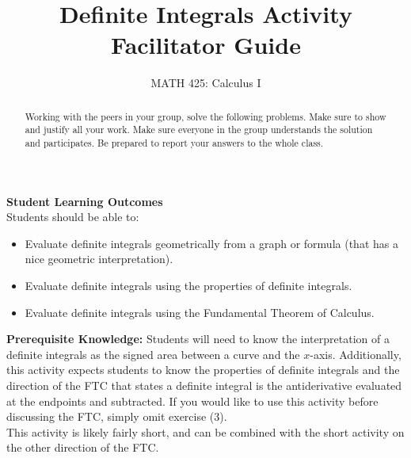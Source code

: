 \documentclass{ximera}
\title{Definite Integrals Activity Facilitator Guide}
\author{MATH 425: Calculus I}
\begin{document}
\begin{abstract}
   Working with the peers in your group, solve the following problems. Make sure to show and justify all your work. Make sure everyone in the group understands the solution and participates. Be prepared to report your answers to the whole class. 
\end{abstract}
\maketitle

\textbf{Student Learning Outcomes}\\
Students should be able to:
    \begin{itemize}
        \item Evaluate definite integrals geometrically from a graph or formula (that has a nice geometric interpretation).
        \item Evaluate definite integrals using the properties of definite integrals.
        \item Evaluate definite integrals using the Fundamental Theorem of Calculus.
    \end{itemize}

\textbf{Prerequisite Knowledge:} Students will need to know the interpretation of a definite integrals as the signed area between a curve and the $x$-axis.  Additionally, this activity expects students to know the properties of definite integrals and the direction of the FTC that states a definite integral is the antiderivative evaluated at the endpoints and subtracted.  If you would like to use this activity before discussing the FTC, simply omit exercise (3).\\

This activity is likely fairly short, and can be combined with the short activity on the other direction of the FTC. 
\end{document}
